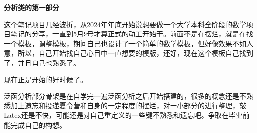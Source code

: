 \begin{center}
	\faSendO  \textbf{分析类的第一部分} \faSendO \\
\end{center}

这个笔记项目几经波折，从2024年年底开始说想要做一个大学本科全阶段的数学项目笔记的分享，一直到5月9号才算正式的动工开始干。前面不是在摆烂，就是在找一个模板，调整模板，期间自己也设计了一个简单的数学模板，但好像效果不如人意，所以，自己开始找自己心目中一直想要的模版，还好，现在这个模板自己找到了，并且自己也熟悉了。

现在正是开始的好时候了。


\vspace{-1pt}

泛函分析部分骨架是在自学完一遍泛函分析之后开始搭建的，很多的概念还是不熟悉加上遗忘和投递夏令营和自身的一定程度的摆烂，对一小部分的进行整理，敲Latex还是不快，可能还是对自己重定义的一些键不熟悉和遗忘吧。争取在毕业前能完成自己的构想。

\vspace{-5pt}